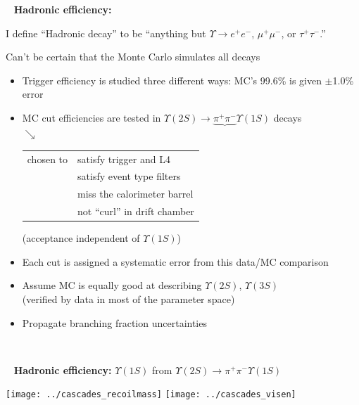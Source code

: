 \documentclass[landscape]{article}
\newenvironment{slide}{\mbox{ }\vfill}{\vfill \mbox{ } \pagebreak}
\begin{document}
\begin{slide}
{\bf Hadronic efficiency:}

\vfill
I define ``Hadronic decay'' to be ``anything but $\Upsilon \to e^+e^-$, $\mu^+\mu^-$, or $\tau^+\tau^-$.''

\vfill
Can't be certain that the Monte Carlo simulates all decays

\vfill
\renewcommand{\labelitemi}{\mbox{\large $\bullet$}} 
\begin{itemize}\setlength{\itemsep}{0.5 cm}

  \item Trigger efficiency is studied three different ways: MC's 99.6\% is given $\pm$1.0\% error

  \item MC cut efficiencies are tested in $\Upsilon(2S) \to \underbrace{\pi^+\pi^-} \Upsilon(1S)$ decays \\
    \mbox{\hspace{13 cm}} $\searrow$ \\
    \mbox{\hspace{12 cm}} \begin{minipage}{11.5 cm} \renewcommand{\arraystretch}{1}
      \begin{tabular}{l l}
	chosen to & satisfy trigger and L4 \\
	& satisfy event type filters \\
	& miss the calorimeter barrel \\
	& not ``curl'' in drift chamber
      \end{tabular}
      (acceptance independent of $\Upsilon(1S)$)
    \end{minipage}

  \item Each cut is assigned a systematic error from this data/MC comparison

  \item Assume MC is equally good at describing $\Upsilon(2S)$, $\Upsilon(3S)$ \\
    (verified by data in most of the parameter space)

  \item Propagate branching fraction uncertainties

\end{itemize}

\vfill
\end{slide}

\begin{slide}
{\bf Hadronic efficiency:} $\Upsilon(1S)$ from $\Upsilon(2S) \to \pi^+\pi^- \Upsilon(1S)$

\vfill
\begin{center}
  \texttt{[image: ../cascades\_recoilmass]}
  \texttt{[image: ../cascades\_visen]}
\end{center}
\end{slide}
\end{document}
